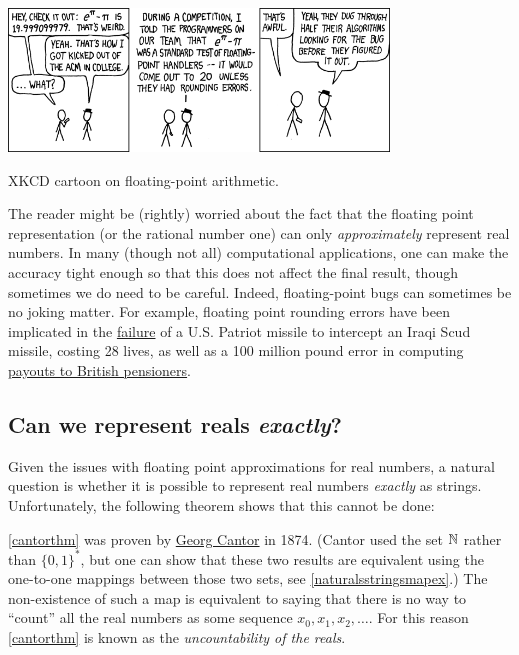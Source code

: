 \begin{marginfigure}
\centering
\includegraphics[width=\linewidth, height=1.5in, keepaspectratio]{../figure/e_to_the_pi_minus_pi.png}
\caption{XKCD cartoon on floating-point arithmetic.}
\label{xkcdfloatingfig}
\end{marginfigure}

The reader might be (rightly) worried about the fact that the floating
point representation (or the rational number one) can only
\emph{approximately} represent real numbers. In many (though not all)
computational applications, one can make the accuracy tight enough so
that this does not affect the final result, though sometimes we do need
to be careful. Indeed, floating-point bugs can sometimes be no joking
matter. For example, floating point rounding errors have been implicated
in the
\href{http://embeddedgurus.com/barr-code/2014/03/lethal-software-defects-patriot-missile-failure/}{failure}
of a U.S. Patriot missile to intercept an Iraqi Scud missile, costing 28
lives, as well as a 100 million pound error in computing
\href{https://catless.ncl.ac.uk/Risks/5/74}{payouts to British
pensioners}.

\subsection{Can we represent reals \emph{exactly}?}\label{cantorsec}

Given the issues with floating point approximations for real numbers, a
natural question is whether it is possible to represent real numbers
\emph{exactly} as strings. Unfortunately, the following theorem shows
that this cannot be done:

\hypertarget{cantorthm}{}

\cref{cantorthm} was proven by
\href{https://en.wikipedia.org/wiki/Georg_Cantor}{Georg Cantor} in 1874.
(Cantor used the set \({\mathbb{N}}\) rather than \(\{0,1\}^*\), but one can show
that these two results are equivalent using the one-to-one mappings
between those two sets, see \cref{naturalsstringsmapex}.) The
non-existence of such a map is equivalent to saying that there is no way
to ``count'' all the real numbers as some sequence
\(x_0,x_1,x_2,\ldots\). For this reason \cref{cantorthm} is known as the
\emph{uncountability of the reals}.


